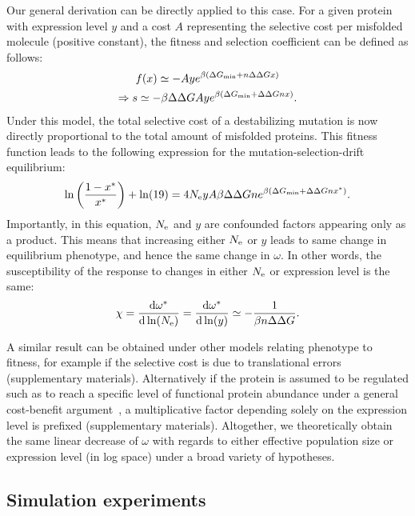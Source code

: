 \documentclass{article}
\begin{document}
Our general derivation can be directly applied to this case.
For a given protein with expression level $y$ and a cost $A$ representing the selective cost per misfolded molecule (positive constant), the fitness and selection coefficient can be defined as follows:
\begin{gather}
    f (x) \simeq - A y e^{\beta (\Delta G_{\text{min}} + n \Delta \Delta G x)} \\
    \Rightarrow s \simeq - \beta \Delta \Delta G A y e^{\beta(\Delta G_{\text{min}} + \Delta \Delta G n x)}.
\end{gather}
Under this model, the total selective cost of a destabilizing mutation is now directly proportional to the total amount of misfolded proteins.
This fitness function leads to the following expression for the mutation-selection-drift equilibrium:
\begin{equation}
    \ln \left( \frac{1 - x^{*}}{x^{*}} \right) + \ln (19) = 4N_{\text{e}} y A \beta \Delta \Delta G n e^{\beta(\Delta G_{\text{min}} + \Delta \Delta G n x^{*})}.
\end{equation}
Importantly, in this equation, $N_{\text{e}}$ and $y$ are confounded factors appearing only as a product.
This means that increasing either $N_{\text{e}}$ or $y$ leads to same change in equilibrium {phenotype}, and hence the same change in $\omega$.
In other words, the susceptibility of the response to changes in either $N_{\text{e}}$ or expression level is the same:
\begin{align}
    \chi = \frac{ \mathrm{d} \omega^{*}}{\mathrm{d} \ln (N_{\text{e}})} = \frac{ \mathrm{d} \omega^{*}}{\mathrm{d} \ln (y)} \simeq - \frac{1}{\beta n \Delta \Delta G}. \label{eq:chi_application_y}
\end{align}

A similar result can be obtained under other models relating {phenotype} to fitness, for example if the selective cost is due to translational errors (supplementary materials).
Alternatively if the protein is assumed to be regulated such as to reach a specific level of functional protein abundance under a general cost-benefit argument~\citep{Cherry2010,Gout2010}, a multiplicative factor depending solely on the expression level is prefixed (supplementary materials).
Altogether, we theoretically obtain the same linear decrease of $\omega$ with regards to either {effective population size} or expression level (in log space) under a broad variety of hypotheses.

\subsection{Simulation experiments}
\end{document}
